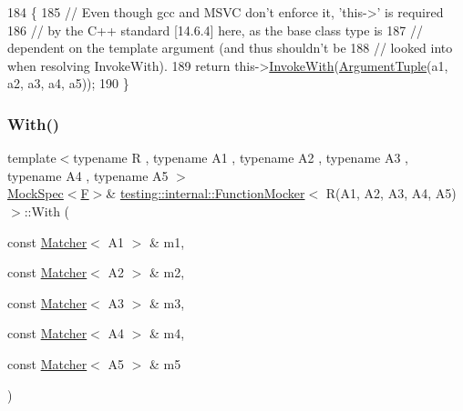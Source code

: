 \begin{DoxyCode}
184                                               \{
185     \textcolor{comment}{// Even though gcc and MSVC don't enforce it, 'this->' is required}
186     \textcolor{comment}{// by the C++ standard [14.6.4] here, as the base class type is}
187     \textcolor{comment}{// dependent on the template argument (and thus shouldn't be}
188     \textcolor{comment}{// looked into when resolving InvokeWith).}
189     \textcolor{keywordflow}{return} this->\hyperlink{classtesting_1_1internal_1_1FunctionMockerBase_a869ec713f000b4e7829c660efc25e8cd}{InvokeWith}(\hyperlink{classtesting_1_1internal_1_1FunctionMocker_3_01R_07A1_00_01A2_00_01A3_00_01A4_00_01A5_08_4_ac82403b3f3e4e65797bb633ade91a43e}{ArgumentTuple}(a1, a2, a3, a4, a5));
190   \}
\end{DoxyCode}
\mbox{\label{classtesting_1_1internal_1_1FunctionMocker_3_01R_07A1_00_01A2_00_01A3_00_01A4_00_01A5_08_4_a719a0f9a249c92c3b990f5ea380899ff}} 
\subsubsection{\texorpdfstring{With()}{With()}}
{\footnotesize\ttfamily template$<$typename R , typename A1 , typename A2 , typename A3 , typename A4 , typename A5 $>$ \\
\hyperlink{classtesting_1_1internal_1_1MockSpec}{Mock\+Spec}$<$\hyperlink{classtesting_1_1internal_1_1FunctionMocker_3_01R_07A1_00_01A2_00_01A3_00_01A4_00_01A5_08_4_a26144c33c64b0af26a1d0c43806a0370}{F}$>$\& \hyperlink{classtesting_1_1internal_1_1FunctionMocker}{testing\+::internal\+::\+Function\+Mocker}$<$ R(A1, A2, A3, A4, A5)$>$\+::With (\begin{DoxyParamCaption}\item[{const \hyperlink{classtesting_1_1Matcher}{Matcher}$<$ A1 $>$ \&}]{m1,  }\item[{const \hyperlink{classtesting_1_1Matcher}{Matcher}$<$ A2 $>$ \&}]{m2,  }\item[{const \hyperlink{classtesting_1_1Matcher}{Matcher}$<$ A3 $>$ \&}]{m3,  }\item[{const \hyperlink{classtesting_1_1Matcher}{Matcher}$<$ A4 $>$ \&}]{m4,  }\item[{const \hyperlink{classtesting_1_1Matcher}{Matcher}$<$ A5 $>$ \&}]{m5 }\end{DoxyParamCaption})\hspace{0.3cm}{\ttfamily [inline]}}



